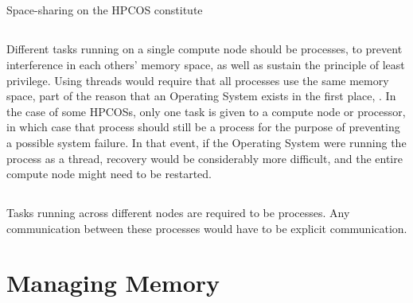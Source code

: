 \documentclass{article}
\begin{document}
\subsection{}
Space-sharing on the HPCOS constitute 

\subsection{}
Different tasks running on a single compute node should be processes, to prevent interference in each others' memory space, as well as sustain the principle of least privilege. Using threads would require that all processes use the same memory space, part of the reason that an Operating System exists in the first place, .
In the case of some HPCOSs, only one task is given to a compute node or processor, in which case that process should still be a process for the purpose of preventing a possible system failure. In that event, if the Operating System were running the process as a thread, recovery would be considerably more difficult, and the entire compute node might need to be restarted.

\subsection{}
Tasks running across different nodes are required to be processes. Any communication between these processes would have to be explicit communication.

\setcounter{section}{4}
\setcounter{subsection}{0}
\section*{Managing Memory}
\subsection{}

\subsection{}

\subsection{}

\subsection{}
\end{document}
